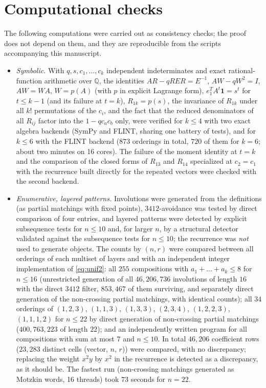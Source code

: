 \documentclass[11pt]{amsart}
\theoremstyle{definition}
\newcommand{\Q}{\mathbb{Q}}
\newcommand{\one}{\mathbf{1}}
\begin{document}
\section*{Computational checks}
The following computations were carried out as consistency checks; the proof does not depend on them, and they are reproducible from the scripts accompanying this manuscript.
\begin{itemize}
\item \emph{Symbolic.} With $q,s,c_1,\dots,c_k$ independent indeterminates and exact rational-function arithmetic over $\Q$, the identities $AR-qRER=E^{-1}$, $AW-qW^2=I$, $AW=WA$, $W=p(A)$ (with $p$ in explicit Lagrange form), $e_1^TA^t\one=s^t$ for $t\le k-1$ (and its failure at $t=k$), $R_{1k}=p(s)$, the invariance of $R_{1k}$ under all $k!$ permutations of the $c_i$, and the fact that the reduced denominators of all $R_{ij}$ factor into the $1-qc_ac_b$ only, were verified for $k\le4$ with two exact algebra backends (SymPy and FLINT, sharing one battery of tests), and for $k\le6$ with the FLINT backend ($873$ orderings in total, $720$ of them for $k=6$; about two minutes on 16 cores). The failure of the moment identity at $t=k$ and the comparison of the closed forms of $R_{13}$ and $R_{14}$ specialized at $c_2=c_1$ with the recurrence built directly for the repeated vectors were checked with the second backend.
\item \emph{Enumerative, layered patterns.} Involutions were generated from the definitions (as partial matchings with fixed points), $3412$-avoidance was tested by direct comparison of four entries, and layered patterns were detected by explicit subsequence tests for $n\le10$ and, for larger $n$, by a structural detector validated against the subsequence tests for $n\le10$; the recurrence was \emph{not} used to generate objects. The counts by $(n,r)$ were compared between all orderings of each multiset of layers and with an independent integer implementation of \eqref{eq:unif2}: all $255$ compositions with $a_1+\dots+a_k\le8$ for $n\le16$ (unrestricted generation of all $46{,}206{,}736$ involutions of length $16$ with the direct $3412$ filter, $853{,}467$ of them surviving, and separately direct generation of the non-crossing partial matchings, with identical counts); all $34$ orderings of $(1,2,3)$, $(1,1,3)$, $(1,3,3)$, $(2,3,4)$, $(1,2,2,3)$, $(1,1,1,2)$ for $n\le22$ by direct generation of non-crossing partial matchings ($400{,}763{,}223$ of length $22$); and an independently written program for all compositions with sum at most $7$ and $n\le10$. In total $46{,}206$ coefficient rows ($23{,}283$ distinct cells (vector, $n$, $r$)) were compared, with no discrepancy; replacing the weight $x^2y$ by $x^2$ in the recurrence is detected as a discrepancy, as it should be. The fastest run (non-crossing matchings generated as Motzkin words, 16 threads) took $73$ seconds for $n=22$.

\end{itemize}
\end{document}
